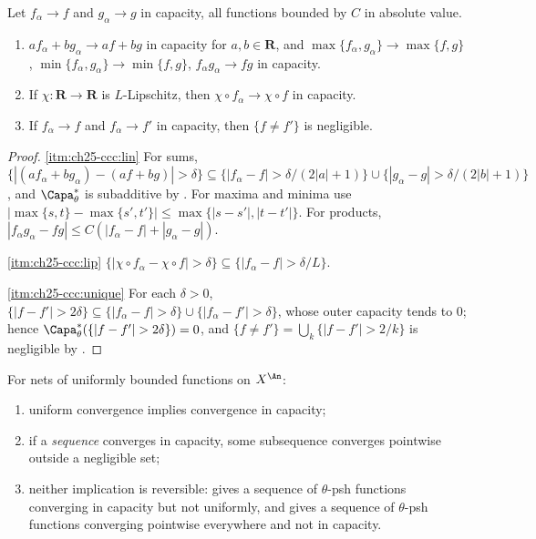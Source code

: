 \begin{proposition}
\label{prop:ch25-capacity-convergence-calculus}
Let $f_\alpha\to f$ and $g_\alpha\to g$ in capacity, all functions
bounded by $C$ in absolute value.
\begin{enumerate}
\item\label{itm:ch25-ccc:lin}
 $af_\alpha+bg_\alpha\to af+bg$ in capacity for $a,b\in\mathbf R$, and
 $\max\{f_\alpha,g_\alpha\}\to\max\{f,g\}$,
 $\min\{f_\alpha,g_\alpha\}\to\min\{f,g\}$,
 $f_\alpha g_\alpha\to fg$ in capacity.
\item\label{itm:ch25-ccc:lip}
 If $\chi:\mathbf R\to\mathbf R$ is $L$-Lipschitz, then
 $\chi\circ f_\alpha\to\chi\circ f$ in capacity.
\item\label{itm:ch25-ccc:unique}
 If $f_\alpha\to f$ and $f_\alpha\to f'$ in capacity, then
 $\{f\neq f'\}$ is negligible.
\end{enumerate}
\end{proposition}

\begin{proof}
\cref{itm:ch25-ccc:lin}  For sums, $\{|(af_\alpha+bg_\alpha)-(af+bg)|
>\delta\}\subseteq\{|f_\alpha-f|>\delta/(2|a|+1)\}\cup
\{|g_\alpha-g|>\delta/(2|b|+1)\}$, and $\Capa^*_\theta$ is subadditive by
.  For maxima and minima use
$|\max\{s,t\}-\max\{s',t'\}|\leq\max\{|s-s'|,|t-t'|\}$.  For products,
$|f_\alpha g_\alpha-fg|\leq C(|f_\alpha-f|+|g_\alpha-g|)$.

\cref{itm:ch25-ccc:lip}  $\{|\chi\circ f_\alpha-\chi\circ f|>\delta\}
\subseteq\{|f_\alpha-f|>\delta/L\}$.

\cref{itm:ch25-ccc:unique}  For each $\delta>0$,
$\{|f-f'|>2\delta\}\subseteq\{|f_\alpha-f|>\delta\}\cup
\{|f_\alpha-f'|>\delta\}$, whose outer capacity tends to $0$; hence
$\Capa^*_\theta(\{|f-f'|>2\delta\})=0$, and
$\{f\neq f'\}=\bigcup_k\{|f-f'|>2/k\}$ is negligible by
.
\end{proof}

\begin{proposition}
\label{prop:ch25-convergence-comparison}
For nets of uniformly bounded functions on $X^{\An}$:
\begin{enumerate}
\item\label{itm:ch25-cc:unif}
 uniform convergence implies convergence in capacity;
\item\label{itm:ch25-cc:seq}
 if a \emph{sequence} converges in capacity, some subsequence converges
 pointwise outside a negligible set;
\item\label{itm:ch25-cc:none}
 neither implication is reversible: 
 gives a sequence of $\theta$-psh functions converging in capacity but not
 uniformly, and  gives a sequence of
 $\theta$-psh functions converging pointwise everywhere and not in
 capacity.
\end{enumerate}
\end{proposition}


